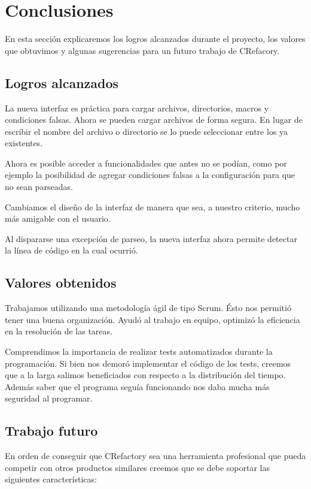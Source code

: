 \documentclass[a4paper,oneside,12pt]{article}
\begin{document}
\section{Conclusiones}
\label{sec:conclusiones}
En esta secci\'on explicaremos los logros alcanzados durante el proyecto, los valores que obtuvimos y algunas sugerencias para un futuro trabajo de CRefacory.

\subsection{Logros alcanzados}
La nueva interfaz es pr\'actica para cargar archivos, directorios, macros y condiciones falsas. Ahora se pueden cargar archivos de forma segura. En lugar de escribir el nombre del archivo o directorio se lo puede seleccionar entre los ya existentes. 

Ahora es posible acceder a funcionalidades que antes no se pod\'ian, como por ejemplo la posibilidad de agregar condiciones falsas a la configuraci\'on para que no sean parseadas.

Cambiamos el diseño de la interfaz de manera que sea, a nuestro criterio, mucho m\'as amigable con el usuario.

Al dispararse una excepci\'on de parseo, la nueva interfaz ahora permite detectar la l\'inea de c\'odigo en la cual ocurri\'o.

\subsection{Valores obtenidos}
Trabajamos utilizando una metodolog\'ia \'agil de tipo Scrum. \'Esto nos permiti\'o tener una buena organizaci\'on. Ayud\'o al trabajo en equipo, optimiz\'o la eficiencia en la resoluci\'on de las tareas.

Comprendimos la importancia de realizar tests automatizados durante la programaci\'on. Si bien nos demor\'o implementar el c\'odigo de los tests, creemos que a la larga salimos beneficiados con respecto a la distribuci\'on del tiempo. Adem\'as saber que el programa segu\'ia funcionando nos daba mucha m\'as seguridad al programar.

\subsection{Trabajo futuro}
En orden de conseguir que CRefactory sea una herramienta profesional que pueda competir con otros productos similares creemos que se debe soportar las siguientes caracter\'isticas:
\end{document}
